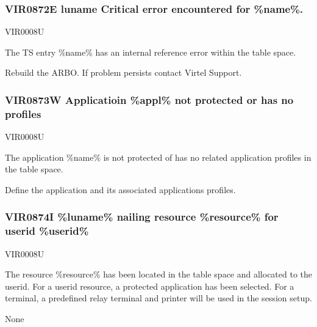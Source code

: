 \documentclass[letterpaper,10pt,english]{sphinxmanual}
\begin{document}
\subsubsection{VIR0872E luname Critical error encountered for \%name\%.}
\label{\detokenize{messages:vir0872e-luname-critical-error-encountered-for-name}}\begin{description}
\sphinxAtStartPar
VIR0008U

\sphinxAtStartPar
The TS entry \%name\% has an internal reference error within the table space.

\sphinxAtStartPar
Rebuild the ARBO. If problem persists contact Virtel Support.

\end{description}


\subsubsection{VIR0873W Applicatioin \%appl\% not protected or has no profiles}
\label{\detokenize{messages:vir0873w-applicatioin-appl-not-protected-or-has-no-profiles}}\begin{description}
\sphinxAtStartPar
VIR0008U

\sphinxAtStartPar
The application \%name\% is not protected of has no related application profiles in the table space.

\sphinxAtStartPar
Define the application and its associated applications profiles.

\end{description}


\subsubsection{VIR0874I \%luname\% nailing resource \%resource\% for userid \%userid\%}
\label{\detokenize{messages:vir0874i-luname-nailing-resource-resource-for-userid-userid}}\begin{description}
\sphinxAtStartPar
VIR0008U

\sphinxAtStartPar
The resource \%resource\% has been located in the table space and allocated to the userid. For a userid resource, a protected application has been selected. For a terminal, a pre\sphinxhyphen{}defined relay terminal and printer will be used in the session setup.

\sphinxAtStartPar
None

\end{description}
\end{document}
